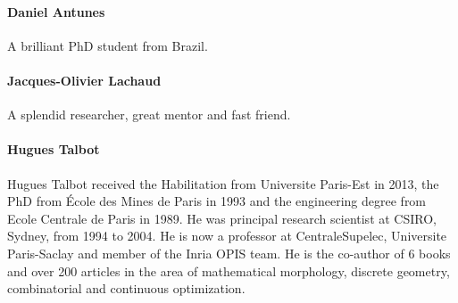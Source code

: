 

\paragraph{Daniel Antunes}
A brilliant PhD student from Brazil.

\paragraph{Jacques-Olivier Lachaud}
A splendid researcher, great mentor and fast friend.

\paragraph{Hugues Talbot}
Hugues Talbot received the Habilitation from Universite Paris-Est in 2013, the PhD from \'Ecole des Mines de Paris in
1993 and the engineering degree from Ecole Centrale de Paris in 1989. He was principal research scientist at CSIRO,
Sydney, from 1994 to 2004. He is now a professor at CentraleSupelec, Universite Paris-Saclay and member of the Inria
OPIS team. He is the co-author of 6 books and over 200 articles in the area of mathematical morphology, discrete
geometry, combinatorial and continuous optimization.

